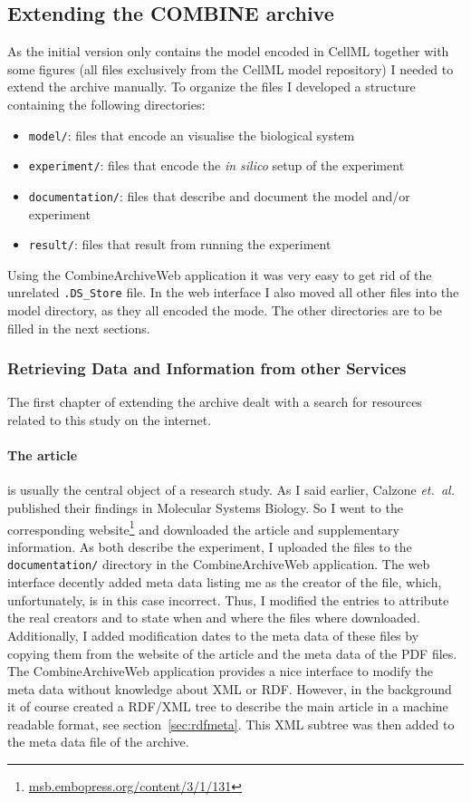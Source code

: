 \subsection{Extending the COMBINE archive}
As the initial version only contains the model encoded in CellML together with some figures (all files exclusively from the CellML model repository) I needed to extend the archive manually.
To organize the files I developed a structure containing the following directories:
\begin{itemize}
 \item \texttt{model/}: files that encode an visualise the biological system
 \item \texttt{experiment/}: files that encode the \textit{in silico} setup of the experiment
 \item \texttt{documentation/}: files that describe and document the model and/or experiment
 \item \texttt{result/}: files that result from running the experiment
\end{itemize}

Using the CombineArchiveWeb application it was very easy to get rid of the unrelated \texttt{.DS\_Store} file. In the web interface I also moved all other files into the model directory, as they all encoded the mode.
The other directories are to be filled in the next sections.

\subsubsection{Retrieving Data and Information from other Services}
The first chapter of extending the archive dealt with a search for resources related to this study on the internet.

\paragraph{The article} is usually the central object of a research study. As I said earlier, Calzone \emph{et.~al.} published their findings in Molecular Systems Biology. So I went to the corresponding website\footnote{\href{http://msb.embopress.org/content/3/1/131}{msb.embopress.org/content/3/1/131}} and downloaded the article and supplementary information.
As both describe the experiment, I uploaded the files to the \texttt{documentation/} directory in the CombineArchiveWeb application.
The web interface decently added meta data listing me as the creator of the file, which, unfortunately, is in this case incorrect.
Thus, I modified the entries to attribute the real creators and to state when and where the files where downloaded.
Additionally, I added modification dates to the meta data of these files by copying them from the website of the article and the meta data of the PDF files.
The CombineArchiveWeb application provides a nice interface to modify the meta data without knowledge about XML or RDF.
However, in the background it of course created a RDF/XML tree to describe the main article in a machine readable format, see section~\ref{sec:rdfmeta}.
This XML subtree was then added to the meta data file of the archive.


